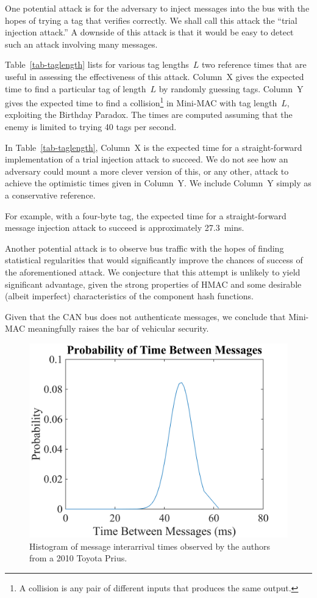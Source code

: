 One potential attack is for the adversary to inject messages into the bus with the hopes
of trying a tag that verifies correctly.  We shall call this attack the ``trial injection attack.''
A downside of this attack is that it would be easy to detect such an attack involving
many messages.

Table~\ref{tab-taglength} lists for various tag lengths~$L$
two reference times that are useful in assessing the effectiveness of this attack.
Column~X gives the expected time to find a particular tag of length~$L$ by
randomly guessing tags.
Column~Y gives the expected time to find a collision\footnote{A collision is any pair of 
different inputs that produces the same output.}
in Mini-MAC with tag length~$L$,
exploiting the Birthday Paradox.  
The times are computed assuming that the enemy is limited to trying 40 tags per second.

In Table~\ref{tab-taglength}, Column~X is the expected time for a straight-forward 
implementation of a trial injection attack to succeed.  We do not see how an adversary
could mount a more clever version of this, or any other, attack to achieve
the optimistic times given in Column~Y.  We include Column~Y simply as a
conservative reference.

For example, with a four-byte tag, the expected time for a straight-forward 
message injection attack to succeed is approximately 27.3~mins.  

Another potential attack is to observe bus traffic with the hopes of finding statistical
regularities that would significantly improve the chances of success of the aforementioned attack.
We conjecture that this attempt is unlikely to yield significant advantage, given the
strong properties of HMAC and some
desirable (albeit imperfect) characteristics of the component hash functions.

Given that the CAN bus does not authenticate messages, we conclude that Mini-MAC
meaningfully raises the bar of vehicular security.

	\selectfont
	\begin{figure}
		\centering
		\includegraphics[width=\columnwidth]{figures/pdf.png}
		\caption{{\selectfont Histogram 
		of message interarrival times observed by the authors from a 2010 Toyota Prius. }}
		\label{fig-msgdelay}
	\end{figure}
	
